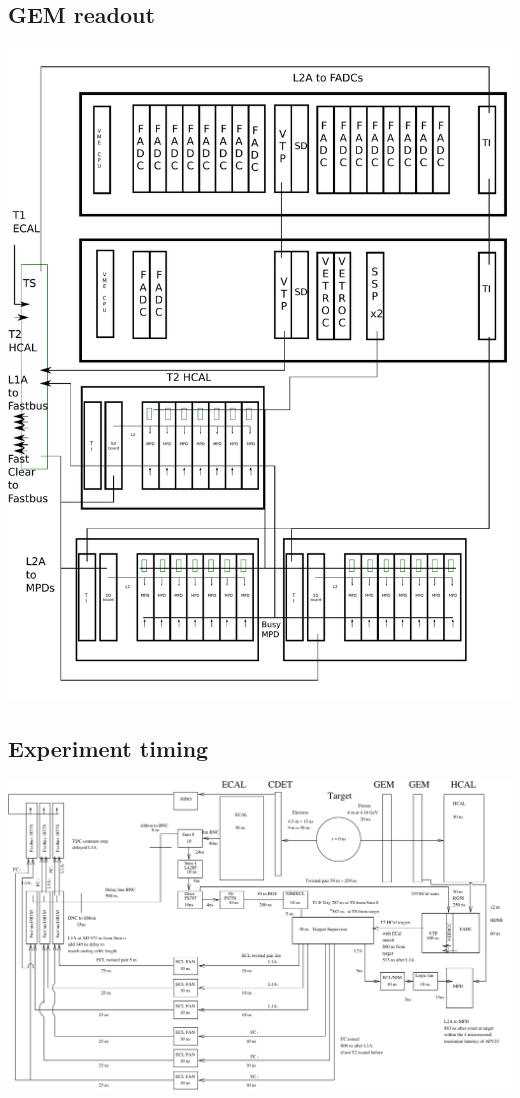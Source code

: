 \documentclass{article}
\begin{document}
\subsection{GEM readout}
 
 \includegraphics[scale=0.4]{figs/NewMPDDetailed.pdf}

  
 \subsection {Experiment timing}
 \newpage
	\includegraphics[scale=0.8,angle=90]{figs/GeP.pdf}
\end{document}
